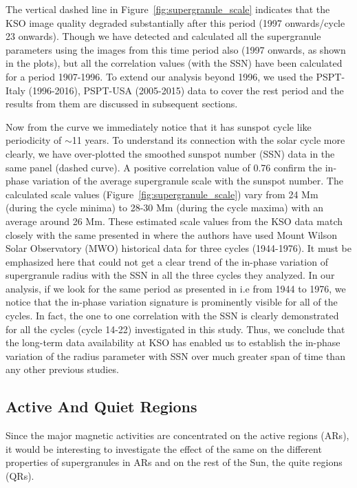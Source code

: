 \documentclass[manuscript]{aastex}	%
\begin{document}
The vertical dashed line in Figure~\ref{fig:supergranule_scale} indicates that the KSO image quality degraded substantially after this period (1997 onwards/cycle 23 onwards). Though we have detected and calculated all the supergranule parameters using the images from this time period also (1997 onwards, as shown in the plots), but all the correlation values (with the SSN) have been calculated for a period 1907-1996. To extend our analysis beyond 1996, we used the PSPT-Italy (1996-2016), PSPT-USA (2005-2015) data to cover the rest period and the results from them are discussed in subsequent sections.


Now from the curve we immediately notice that it has sunspot cycle like periodicity of $\sim$11 years. To understand its connection with the solar cycle more clearly, we have over-plotted the smoothed sunspot number (SSN) data in the same panel (dashed curve). A positive correlation value of 0.76 confirm the in-phase variation of the average supergranule scale with the sunspot number. The calculated scale values (Figure~\ref{fig:supergranule_scale}) vary from 24 $\mathrm{Mm}$ (during the cycle minima) to 28-30 $\mathrm{Mm}$ (during the cycle maxima) with an average around 26 $\mathrm{Mm}$. These estimated scale values from the KSO data match closely with the same presented in \citet{2041-8205-730-1-L3} where the authors have used Mount Wilson Solar Observatory (MWO) historical data for three cycles (1944-1976). It must be emphasized here that \citet{2041-8205-730-1-L3} could not get a clear trend of the in-phase variation of supergranule radius with the SSN in all the three cycles they analyzed. In our analysis, if we look for the same period as presented in \citet{2041-8205-730-1-L3} i.e from 1944 to 1976, we notice that the in-phase variation signature is prominently visible for all of the cycles. In fact, the one to one correlation with the SSN is clearly demonstrated for all the cycles (cycle 14-22) investigated in this study. Thus, we conclude that the long-term data availability at KSO has enabled us to establish the in-phase variation of the radius parameter with SSN over much greater span of time than any other previous studies.

\subsection{Active And Quiet Regions}

Since the major magnetic activities are concentrated on the active regions (ARs), it would be interesting to investigate the effect of the same on the different properties of supergranules in ARs and on the rest of the Sun, the quite regions (QRs).
\end{document}

